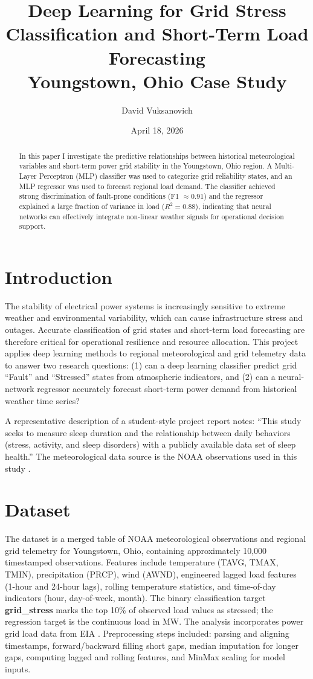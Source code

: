 \documentclass[11pt]{article}
\title{Deep Learning for Grid Stress Classification and Short-Term Load Forecasting\\
\large Youngstown, Ohio Case Study}
\author{David Vuksanovich}
\date{April 18, 2026}
\begin{document}
\maketitle

\begin{abstract}
In this paper I investigate the predictive relationships between historical meteorological variables and short-term power grid stability in the Youngstown, Ohio region. A Multi-Layer Perceptron (MLP) classifier was used to categorize grid reliability states, and an MLP regressor was used to forecast regional load demand. The classifier achieved strong discrimination of fault-prone conditions (F1 \(\approx 0.91\)) and the regressor explained a large fraction of variance in load (\(R^{2}=0.88\)), indicating that neural networks can effectively integrate non-linear weather signals for operational decision support.
\end{abstract}

\section{Introduction}
The stability of electrical power systems is increasingly sensitive to extreme weather and environmental variability, which can cause infrastructure stress and outages. Accurate classification of grid states and short-term load forecasting are therefore critical for operational resilience and resource allocation. This project applies deep learning methods to regional meteorological and grid telemetry data to answer two research questions: (1) can a deep learning classifier predict grid ``Fault'' and ``Stressed'' states from atmospheric indicators, and (2) can a neural-network regressor accurately forecast short-term power demand from historical weather time series?

A representative description of a student-style project report notes: ``This study seeks to measure sleep duration and the relationship between daily behaviors (stress, activity, and sleep disorders) with a publicly available data set of sleep health.'' The meteorological data source is the NOAA observations used in this study \cite{noaa_dataset_new}.

\section{Dataset}
The dataset is a merged table of NOAA meteorological observations and regional grid telemetry for Youngstown, Ohio, containing approximately 10,000 timestamped observations. Features include temperature (TAVG, TMAX, TMIN), precipitation (PRCP), wind (AWND), engineered lagged load features (1-hour and 24-hour lags), rolling temperature statistics, and time-of-day indicators (hour, day-of-week, month). The binary classification target \textbf{grid\_stress} marks the top 10\% of observed load values as stressed; the regression target is the continuous load in MW. The analysis incorporates power grid load data from EIA \cite{power_grid_data}. Preprocessing steps included: parsing and aligning timestamps, forward/backward filling short gaps, median imputation for longer gaps, computing lagged and rolling features, and MinMax scaling for model inputs.
\end{document}
